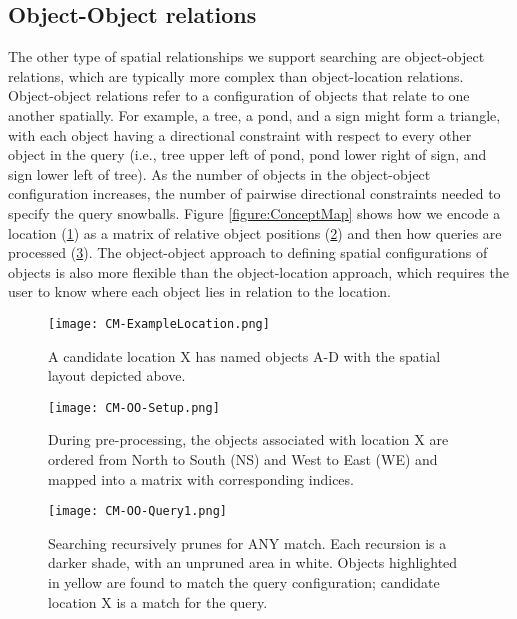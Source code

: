 \subsection{Object-Object relations}
The other type of spatial relationships we support searching are object-object relations, which are typically more complex than object-location relations.
Object-object relations refer to a configuration of objects that relate to one another spatially.
For example, a tree, a pond, and a sign might form a triangle, with each object having a directional constraint with respect to every other object in the query (i.e., tree upper left of pond, pond lower right of sign, and sign lower left of tree).
As the number of objects in the object-object configuration increases, the number of pairwise directional constraints needed to specify the query snowballs. 
Figure \ref{figure:ConceptMap} shows how we encode a location (\ref{fig:CM-Example}) as a matrix of relative object positions (\ref{fig:CM-OO-Setup}) and then how queries are processed (\ref{fig:CM-OO-Query}).
The object-object approach to defining spatial configurations of objects is also more flexible than the object-location approach, which requires the user to know where each object lies in relation to the location. 



\begin{figure*}[h]
    \centering
    \begin{subfigure}[t]{.25\textwidth}
        \texttt{[image: CM-ExampleLocation.png]}
        \caption{\small A candidate location X has named objects A-D with the spatial layout depicted above.}
        \label{fig:CM-Example}
    \end{subfigure}
    \hfill
    \begin{subfigure}[t]{.25\textwidth}
        \texttt{[image: CM-OO-Setup.png]}
        \caption{\small During pre-processing, the objects associated with location X are ordered from North to South (NS) and West to East (WE) and mapped into a matrix with corresponding indices.}
        \label{fig:CM-OO-Setup}
    \end{subfigure}
    \hfill
        \begin{subfigure}[t]{.25\textwidth}
        \texttt{[image: CM-OO-Query1.png]}
        \caption{\small Searching recursively prunes for ANY match. Each recursion is a darker shade, with an unpruned area in white. Objects highlighted in yellow are found to match the query configuration; candidate location X is a match for the query.}
        \label{fig:CM-OO-Query}
    \hfill
    \end{subfigure}
    \caption{\textbf{Object-Object Search Method. }}\label{figure:ConceptMap} 
\end{figure*}


